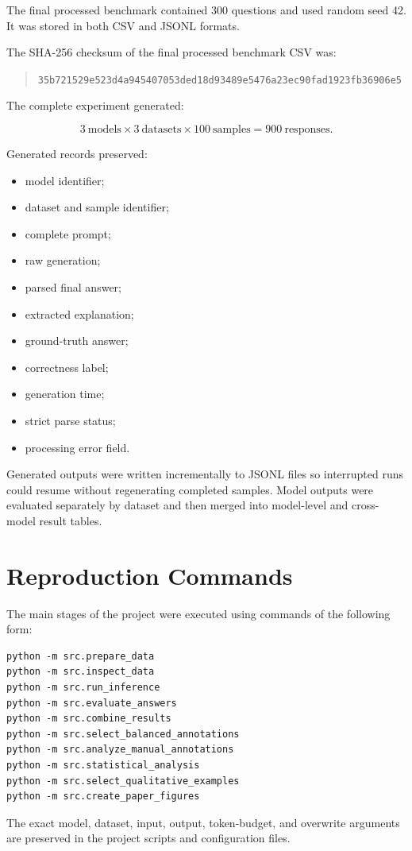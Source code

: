 The final processed benchmark contained 300 questions and used random seed 42.
It was stored in both CSV and JSONL formats.

The SHA-256 checksum of the final processed benchmark CSV was:

\begin{quote}
\small
\texttt{35b721529e523d4a945407053ded18d93489e5476a23ec90fad1923fb36906e5}
\end{quote}

The complete experiment generated:

\[
3\ \text{models}
\times
3\ \text{datasets}
\times
100\ \text{samples}
=
900\ \text{responses}.
\]

Generated records preserved:

\begin{itemize}
    \item model identifier;
    \item dataset and sample identifier;
    \item complete prompt;
    \item raw generation;
    \item parsed final answer;
    \item extracted explanation;
    \item ground-truth answer;
    \item correctness label;
    \item generation time;
    \item strict parse status;
    \item processing error field.
\end{itemize}

Generated outputs were written incrementally to JSONL files so interrupted
runs could resume without regenerating completed samples. Model outputs were
evaluated separately by dataset and then merged into model-level and
cross-model result tables.

\section{Reproduction Commands}
\label{app:commands}

The main stages of the project were executed using commands of the following
form:

\begin{verbatim}
python -m src.prepare_data
python -m src.inspect_data
python -m src.run_inference
python -m src.evaluate_answers
python -m src.combine_results
python -m src.select_balanced_annotations
python -m src.analyze_manual_annotations
python -m src.statistical_analysis
python -m src.select_qualitative_examples
python -m src.create_paper_figures
\end{verbatim}

The exact model, dataset, input, output, token-budget, and overwrite arguments
are preserved in the project scripts and configuration files.
